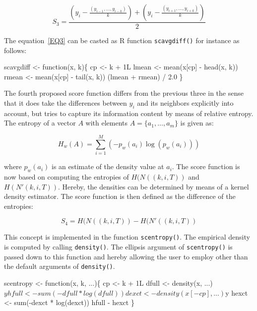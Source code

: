 \documentclass[a4paper]{article}
\begin{document}
\begin{equation}
\label{EQ3}
S_3 = \frac{
(y_i - \frac{(y_{i-1}, \ldots, y_{i-k})}{k}) +
(y_i - \frac{(y_{i+1}, \ldots, y_{i+k})}{k})}{2}
\end{equation}

The equation~\eqref{EQ3} can be casted as R function \verb?scavgdiff()?
for instance as follows:

\nwenddocs{}\endmoddef
scavgdiff <- function(x, k)\{
    cp <- k + 1L
    lmean <- mean(x[cp] - head(x, k))
    rmean <- mean(x[cp] - tail(x, k))
    (lmean + rmean) / 2.0
\}
\eatline
{}\nwendcode{}%

The fourth proposed score function differs from the previous three in
the sense that it does take the differences between $y_i$
and its neighbors explicitly into account, but tries to capture its
information content by means of relative entropy. The entropy of a
vector $A$ with elements $A = \{a_1, \ldots, a_m\}$ is given as:

\begin{equation}
H_w(A) = \sum_{i=1}^M \left(-p_w(a_i)\log(p_w(a_i))\right)
\end{equation}

where $p_w(a_i)$ is an estimate of the density value at $a_i$. The
score function is now based on computing the entropies of $H(N((k, i,
T))$ and $H(N'(k, i, T))$. Hereby, the densities can be determined by
means of a kernel density estimator. The score function is then
defined as the difference of the entropies:

\begin{equation}
\label{EQ4}
S_4 = H(N((k, i, T)) - H(N'((k, i, T))
\end{equation}

This concept is implemented in the function \verb?scentropy()?. The
empirical density is computed by calling \verb?density()?. The ellipsis
argument of \verb?scentropy()? is passed down to this function and hereby
allowing the user to employ other than the default arguments of
\verb?density()?.

\nwenddocs{}\endmoddef
scentropy <- function(x, k, ...)\{
    cp <- k + 1L
    dfull <- density(x, ...)$y
    hfull <- sum(-dfull * log(dfull))
    dexct <- density(x[-cp], ...)$y
    hexct <- sum(-dexct * log(dexct))
    hfull - hexct
\}
\eatline
{}\nwendcode{}%
\end{document}
